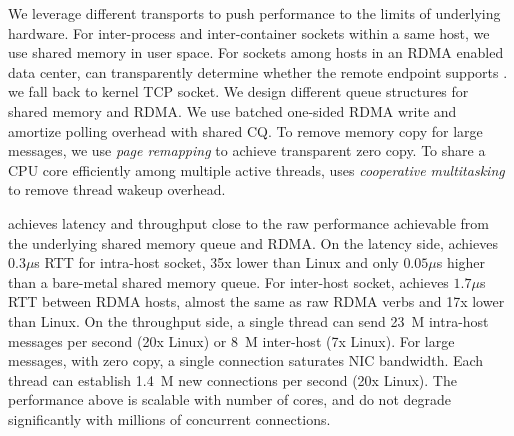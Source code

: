 We leverage different transports to push performance to the limits of underlying hardware.
For inter-process and inter-container sockets within a same host, we use shared memory in user space.
For sockets among hosts in an RDMA enabled data center, \sys can transparently determine whether the remote endpoint supports \sys.
we fall back to kernel TCP socket.
We design different queue structures for shared memory and RDMA.
We use batched one-sided RDMA write and amortize polling overhead with shared CQ.
To remove memory copy for large messages, we use \emph{page remapping} to achieve transparent zero copy.
To share a CPU core efficiently among multiple active threads, \sys uses \emph{cooperative multitasking} to remove thread wakeup overhead.

\fi



\sys{} achieves latency and throughput close to the raw performance achievable from the underlying shared memory queue and RDMA.
On the latency side, \sys{} achieves $0.3\mu$s RTT for intra-host socket, 35x lower than Linux and only $0.05\mu$s higher than a bare-metal shared memory queue. For inter-host socket, \sys{} achieves $1.7\mu$s RTT between RDMA hosts, almost the same as raw RDMA verbs and 17x lower than Linux.
On the throughput side, a single thread can send 23~M intra-host messages per second (20x Linux) or 8~M inter-host (7x Linux). For large messages, with zero copy, a single connection saturates NIC bandwidth. Each thread can establish 1.4~M new connections per second (20x Linux). The performance above is scalable with number of cores, and do not degrade significantly with millions of concurrent connections.


